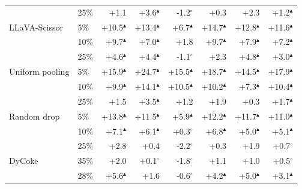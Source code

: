 \begin{table}[t]
\begin{tabular}{llrrrrrr}
 & 25\% & +1.1 & +3.6$^{\blacktriangle}$ & -1.2$^{\circ}$ & +0.3 & +2.3 & +1.2$^{\blacktriangle}$ \\
\addlinespace[2pt]
LLaVA-Scissor & 5\% & +10.5$^{\blacktriangle}$ & +13.4$^{\blacktriangle}$ & +6.7$^{\blacktriangle}$ & +14.7$^{\blacktriangle}$ & +12.8$^{\blacktriangle}$ & +11.6$^{\blacktriangle}$ \\
 & 10\% & +9.7$^{\blacktriangle}$ & +7.0$^{\blacktriangle}$ & +1.8 & +9.7$^{\blacktriangle}$ & +7.9$^{\blacktriangle}$ & +7.2$^{\blacktriangle}$ \\
 & 25\% & +4.6$^{\blacktriangle}$ & +4.4$^{\blacktriangle}$ & -1.1$^{\circ}$ & +2.3 & +4.8$^{\blacktriangle}$ & +3.0$^{\blacktriangle}$ \\
\addlinespace[2pt]
Uniform pooling & 5\% & +15.9$^{\blacktriangle}$ & +24.7$^{\blacktriangle}$ & +15.5$^{\blacktriangle}$ & +18.7$^{\blacktriangle}$ & +14.5$^{\blacktriangle}$ & +17.9$^{\blacktriangle}$ \\
 & 10\% & +9.9$^{\blacktriangle}$ & +14.1$^{\blacktriangle}$ & +10.5$^{\blacktriangle}$ & +10.2$^{\blacktriangle}$ & +7.3$^{\blacktriangle}$ & +10.4$^{\blacktriangle}$ \\
 & 25\% & +1.5 & +3.5$^{\blacktriangle}$ & +1.2 & +1.9 & +0.3 & +1.7$^{\blacktriangle}$ \\
\addlinespace[2pt]
Random drop & 5\% & +13.8$^{\blacktriangle}$ & +11.5$^{\blacktriangle}$ & +5.9$^{\blacktriangle}$ & +12.2$^{\blacktriangle}$ & +11.7$^{\blacktriangle}$ & +11.0$^{\blacktriangle}$ \\
 & 10\% & +7.1$^{\blacktriangle}$ & +6.1$^{\blacktriangle}$ & +0.3$^{\circ}$ & +6.8$^{\blacktriangle}$ & +5.0$^{\blacktriangle}$ & +5.1$^{\blacktriangle}$ \\
 & 25\% & +2.8 & +0.4 & -2.2$^{\circ}$ & +0.3 & +1.9 & +0.7$^{\circ}$ \\
\addlinespace[2pt]
DyCoke & 35\% & +2.0 & +0.1$^{\circ}$ & -1.8$^{\circ}$ & +1.1 & +1.0 & +0.5$^{\circ}$ \\
 & 28\% & +5.6$^{\blacktriangle}$ & +1.6 & -0.6$^{\circ}$ & +4.2$^{\blacktriangle}$ & +5.0$^{\blacktriangle}$ & +3.1$^{\blacktriangle}$ \\
\bottomrule
\end{tabular}
\end{table}